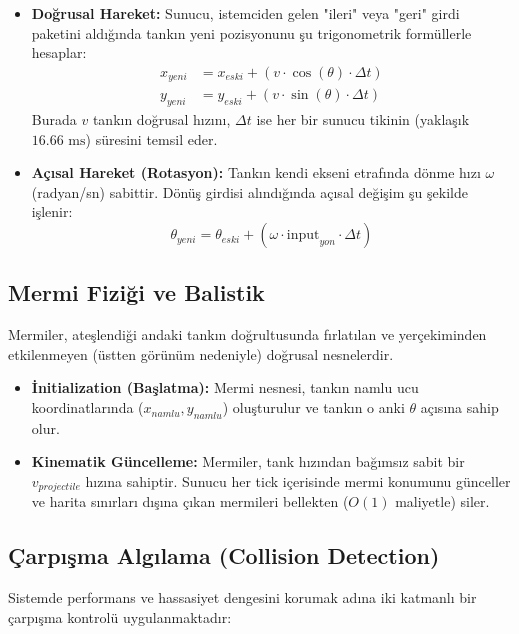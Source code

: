 \documentclass[12pt,a4paper]{article}
\begin{document}
\begin{itemize}
      \item \textbf{Doğrusal Hareket:} Sunucu, istemciden gelen "ileri" veya "geri" girdi paketini aldığında tankın yeni pozisyonunu şu trigonometrik formüllerle hesaplar:
            \begin{align*}
                  x_{yeni} & = x_{eski} + (v \cdot \cos(\theta) \cdot \Delta t) \\
                  y_{yeni} & = y_{eski} + (v \cdot \sin(\theta) \cdot \Delta t)
            \end{align*}
            Burada $v$ tankın doğrusal hızını, $\Delta t$ ise her bir sunucu tikinin (yaklaşık $16.66 \text{ ms}$) süresini temsil eder.

      \item \textbf{Açısal Hareket (Rotasyon):} Tankın kendi ekseni etrafında dönme hızı $\omega$ (radyan/sn) sabittir. Dönüş girdisi alındığında açısal değişim şu şekilde işlenir:
            \[ \theta_{yeni} = \theta_{eski} + (\omega \cdot \text{input}_{yon} \cdot \Delta t) \]
\end{itemize}


\subsection{Mermi Fiziği ve Balistik}
Mermiler, ateşlendiği andaki tankın doğrultusunda fırlatılan ve yerçekiminden etkilenmeyen (üstten görünüm nedeniyle) doğrusal nesnelerdir.

\begin{itemize}
      \item \textbf{İnitialization (Başlatma):} Mermi nesnesi, tankın namlu ucu koordinatlarında ($x_{namlu}, y_{namlu}$) oluşturulur ve tankın o anki $\theta$ açısına sahip olur.
      \item \textbf{Kinematik Güncelleme:} Mermiler, tank hızından bağımsız sabit bir $v_{projectile}$ hızına sahiptir. Sunucu her tick içerisinde mermi konumunu günceller ve harita sınırları dışına çıkan mermileri bellekten ($O(1)$ maliyetle) siler.
\end{itemize}


\subsection{Çarpışma Algılama (Collision Detection)}
Sistemde performans ve hassasiyet dengesini korumak adına iki katmanlı bir çarpışma kontrolü uygulanmaktadır:
\end{document}
